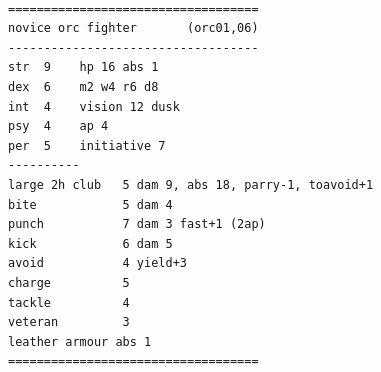 \

\goodbreak \begin{samepage} \small \begin{verbatim}
===================================
novice orc fighter       (orc01,06)
-----------------------------------
str  9    hp 16 abs 1
dex  6    m2 w4 r6 d8
int  4    vision 12 dusk
psy  4    ap 4
per  5    initiative 7
----------
large 2h club   5 dam 9, abs 18, parry-1, toavoid+1
bite           	5 dam 4
punch          	7 dam 3 fast+1 (2ap)
kick            6 dam 5 
avoid          	4 yield+3
charge         	5
tackle         	4
veteran        	3
leather armour abs 1
===================================
\end{verbatim} \normalsize \end{samepage}










